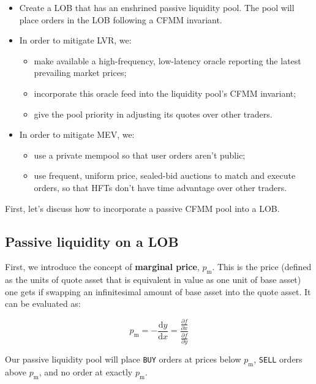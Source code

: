 \documentclass{article}
\begin{document}
\begin{itemize}
  \item Create a LOB that has an enshrined passive liquidity pool. The pool will place orders in the LOB following a CFMM invariant.
  \item In order to mitigate LVR, we:
        \begin{itemize}
          \item make available a high-frequency, low-latency oracle reporting the latest prevailing market prices;
          \item incorporate this oracle feed into the liquidity pool's CFMM invariant;
          \item give the pool priority in adjusting its quotes over other traders.
        \end{itemize}
  \item In order to mitigate MEV, we:
        \begin{itemize}
          \item use a private mempool so that user orders aren't public;
          \item use frequent, uniform price, sealed-bid auctions to match and execute orders, so that HFTs don't have time advantage over other traders.
        \end{itemize}
\end{itemize}

First, let's discuss how to incorporate a passive CFMM pool into a LOB.

\subsection{Passive liquidity on a LOB}

First, we introduce the concept of \textbf{marginal price}, $p_{\mathrm{m}}$. This is the price (defined as the units of quote asset that is equivalent in value as one unit of base asset) one gets if swapping an infinitesimal amount of base asset into the quote asset. It can be evaluated as:

\begin{equation}
  p_{\mathrm{m}} = - \frac{\mathrm{d}y}{\mathrm{d}x} = \frac{\frac{\partial f}{\partial x}}{\frac{\partial f}{\partial y}}
\end{equation}

Our passive liquidity pool will place \texttt{BUY} orders at prices below $p_{\mathrm{m}}$, \texttt{SELL} orders above $p_{\mathrm{m}}$, and no order at exactly $p_{\mathrm{m}}$.
\end{document}
